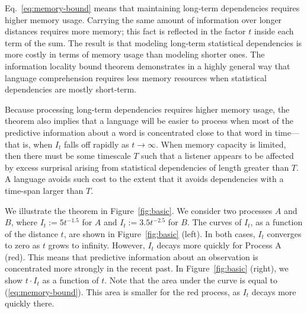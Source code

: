 Eq.~\ref{eq:memory-bound} means that maintaining long-term dependencies requires higher memory usage. Carrying the same amount of information over longer distances requires more memory; this fact is reflected in the factor $t$ inside each term of the sum. 
The result is that modeling long-term statistical dependencies is more costly in terms of memory usage than modeling shorter ones.
The information locality bound theorem demonstrates in a highly general way that language comprehension requires less memory resources when statistical dependencies are mostly short-term. 

Because processing long-term dependencies requires higher memory usage, the theorem also implies that a language will be easier to process when most of the predictive information about a word is concentrated close to that word in time---that is, when $I_t$ falls off rapidly as $t \rightarrow \infty$. When memory capacity is limited, then there must be some timescale $T$ such that a listener appears to be affected by excess surprisal arising from statistical dependencies of length greater than $T$. A language avoids such cost to the extent that it avoids dependencies with a time-span larger than $T$.

We illustrate the theorem in Figure~\ref{fig:basic}.
We consider two processes $A$ and $B$, where $I_t := 5t^{-1.5}$ for $A$ and $I_t := 3.5 t^{-2.5}$ for $B$.
The curves of $I_t$, as a function of the distance $t$, are shown in Figure~\ref{fig:basic} (left).
In both cases, $I_t$ converges to zero as $t$ grows to infinity. 
However, $I_t$ decays more quickly for Process A (red).
This means that predictive information about an observation is concentrated more strongly in the recent past.
In Figure~\ref{fig:basic} (right), we show $t\cdot I_t$ as a function of $t$.
Note that the area under the curve is equal to (\ref{eq:memory-bound}).
This area is smaller for the red process, as $I_t$ decays more quickly there.  



